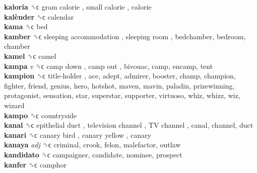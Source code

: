 \textbf{kaloria} ␝ϲ   gram calorie ,  small calorie , calorie  \\
\textbf{kalènder} ␝ϲ  calendar  \\
\textbf{kama} ␝ϲ  bed  \\
\textbf{kamber} ␝ϲ   sleeping accommodation ,  sleeping room , bedchamber, bedroom, chamber  \\
\textbf{kamel} ␝ϲ  camel  \\
\textbf{kampa} \emph{v}  ␝ϲ   camp down ,  camp out , bivouac, camp, encamp, tent  \\
\textbf{kampion} ␝ϲ   title-holder , ace, adept, admirer, booster, champ, champion, fighter, friend, genius, hero, hotshot, maven, mavin, paladin, prizewinning, protagonist, sensation, star, superstar, supporter, virtuoso, whiz, whizz, wiz, wizard  \\
\textbf{kampo} ␝ϲ  countryside  \\
\textbf{kanal} ␝ϲ   epithelial duct ,  television channel ,  TV channel , canal, channel, duct  \\
\textbf{kanari} ␝ϲ   canary bird ,  canary yellow , canary  \\
\textbf{kanaya} \emph{adj}  ␝ϲ  criminal, crook, felon, malefactor, outlaw  \\
\textbf{kandidato} ␝ϲ  campaigner, candidate, nominee, prospect  \\
\textbf{kanfer} ␝ϲ  camphor  \\
